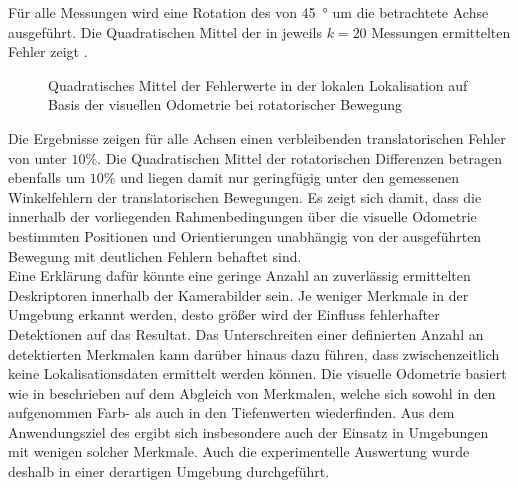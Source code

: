 Für alle Messungen wird eine Rotation des  von \SI{45}{°} um die betrachtete Achse ausgeführt. Die Quadratischen Mittel der in jeweils $k=20$ Messungen ermittelten Fehler zeigt .\\

\begin{figure}[!ht]

\caption{Quadratisches Mittel der Fehlerwerte in der lokalen Lokalisation auf Basis der visuellen Odometrie bei rotatorischer Bewegung}
\label{fig.loc_loc_rot_fovis}
\end{figure}%


Die Ergebnisse zeigen für alle Achsen einen verbleibenden translatorischen Fehler von unter $10\%$. Die Quadratischen Mittel der rotatorischen Differenzen betragen ebenfalls um $10\%$ und liegen damit nur geringfügig unter den gemessenen Winkelfehlern der translatorischen Bewegungen. Es zeigt sich damit, dass die innerhalb der vorliegenden Rahmenbedingungen über die visuelle Odometrie bestimmten Positionen und Orientierungen unabhängig von der ausgeführten Bewegung mit deutlichen Fehlern behaftet sind.\\

Eine Erklärung dafür könnte eine geringe Anzahl an zuverlässig ermittelten Deskriptoren innerhalb der Kamerabilder sein. Je weniger Merkmale in der Umgebung erkannt werden, desto größer wird der Einfluss fehlerhafter Detektionen auf das Resultat. Das Unterschreiten einer definierten Anzahl an detektierten Merkmalen kann darüber hinaus dazu führen, dass zwischenzeitlich keine Lokalisationsdaten ermittelt werden können. Die visuelle Odometrie basiert wie in  beschrieben auf dem Abgleich von Merkmalen, welche sich sowohl in den aufgenommen Farb- als auch in den Tiefenwerten wiederfinden. Aus dem Anwendungsziel des  ergibt sich insbesondere auch der Einsatz in Umgebungen mit wenigen solcher Merkmale. Auch die experimentelle Auswertung wurde deshalb in einer derartigen Umgebung durchgeführt.\\

